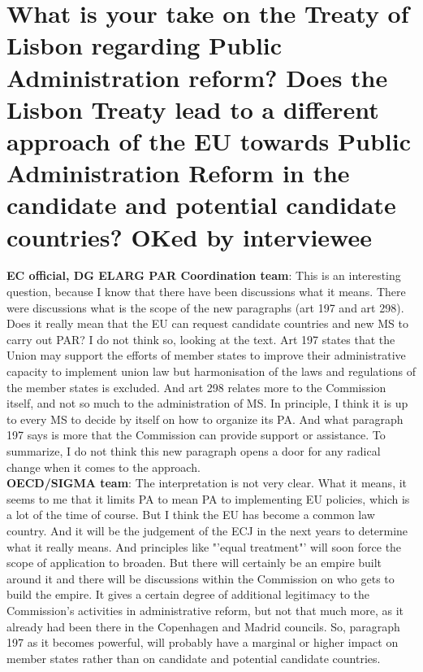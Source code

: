 \section{What is your take on the Treaty of Lisbon regarding Public Administration reform? Does the Lisbon Treaty lead to a different approach of the EU towards Public Administration Reform in the candidate and potential candidate countries? OKed by interviewee}
\textbf{EC official, DG ELARG PAR Coordination team}: This is an interesting question, because I know that there have been discussions what it means. There were discussions what is the scope of the new paragraphs (art 197 and art 298). Does it really mean that the EU can request candidate countries and new MS to carry out PAR? I do not think so, looking at the text. Art 197 states that the Union may support the efforts of member states to improve their administrative capacity to implement union law but harmonisation of the laws and regulations of the member states is excluded. And art 298 relates more to the Commission itself, and not so much to the administration of MS. In principle, I think it is up to every MS to decide by itself on how to organize its PA. And what paragraph 197 says is more that the Commission can provide support or assistance. To summarize, I do not think this new paragraph opens a door for any radical change when it comes to the approach. \\
\textbf{OECD/SIGMA team}: The interpretation is not very clear. What it means, it seems to me that it limits PA to mean PA to implementing EU policies, which is a lot of the time of course. But I think the EU has become a common law country. And it will be the judgement of the ECJ in the next years to determine what it really means. And principles like "'equal treatment"' will soon force the scope of application to broaden. But there will certainly be an empire built around it and there will be discussions within the Commission on who gets to build the empire. It gives a certain degree of additional legitimacy to the Commission's activities in administrative reform, but not that much more, as it already had been there in the Copenhagen and Madrid councils. So, paragraph 197 as it becomes powerful, will probably have a marginal or higher impact on member states rather than on candidate and potential candidate countries.\\
